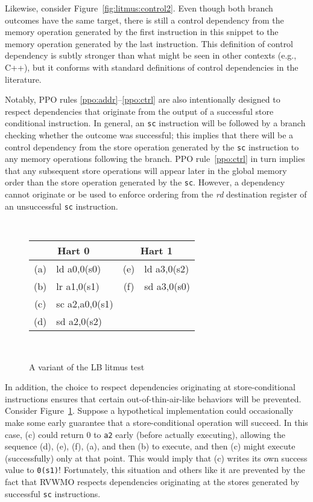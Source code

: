Likewise, consider Figure~\ref{fig:litmus:control2}.
Even though both branch outcomes have the same target, there is still a control dependency from the memory operation generated by the first instruction in this snippet to the memory operation generated by the last instruction.
This definition of control dependency is subtly stronger than what might be seen in other contexts (e.g., C++), but it conforms with standard definitions of control dependencies in the literature.

Notably, PPO rules \ref{ppo:addr}--\ref{ppo:ctrl} are also intentionally designed to respect dependencies that originate from the output of a successful store conditional instruction.
In general, an {\tt sc} instruction will be followed by a branch checking whether the outcome was successful; this implies that there will be a control dependency from the store operation generated by the {\tt sc} instruction to any memory operations following the branch.
PPO rule~\ref{ppo:ctrl} in turn implies that any subsequent store operations will appear later in the global memory order than the store operation generated by the {\tt sc}.
However, a dependency cannot originate or be used to enforce ordering from the {\em rd} destination register of an unsuccessful {\tt sc} instruction.

\begin{figure}[h!]
  \center
  {
    \tt\small
    \begin{tabular}{cl||cl}
    \multicolumn{2}{c}{Hart 0} & \multicolumn{2}{c}{Hart 1} \\
    \hline
      (a) & ld a0,0(s0)    & (e) & ld a3,0(s2) \\
      (b) & lr a1,0(s1)    & (f) & sd a3,0(s0) \\
      (c) & sc a2,a0,0(s1) &                    \\
      (d) & sd a2,0(s2)    &                    \\
    \end{tabular}
  }
  ~~~~
  \diagram
  \caption{A variant of the LB litmus test}
  \label{fig:litmus:successdeps}
\end{figure}

In addition, the choice to respect dependencies originating at store-conditional instructions ensures that certain out-of-thin-air-like behaviors will be prevented.
Consider Figure~\ref{fig:litmus:successdeps}.
Suppose a hypothetical implementation could occasionally make some early guarantee that a store-conditional operation will succeed.
In this case, (c) could return 0 to {\tt a2} early (before actually executing), allowing the sequence (d), (e), (f), (a), and then (b) to execute, and then (c) might execute (successfully) only at that point.
This would imply that (c) writes its own success value to {\tt 0(s1)}!
Fortunately, this situation and others like it are prevented by the fact that RVWMO respects dependencies originating at the stores generated by successful {\tt sc} instructions.


